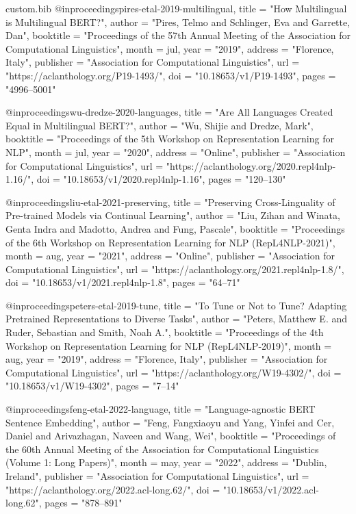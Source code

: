 \begin{filecontents*}[overwrite]{custom.bib}
@inproceedings{pires-etal-2019-multilingual,
    title = "How Multilingual is Multilingual {BERT}?",
    author = "Pires, Telmo  and
      Schlinger, Eva  and
      Garrette, Dan",
    booktitle = "Proceedings of the 57th Annual Meeting of the Association for Computational Linguistics",
    month = jul,
    year = "2019",
    address = "Florence, Italy",
    publisher = "Association for Computational Linguistics",
    url = "https://aclanthology.org/P19-1493/",
    doi = "10.18653/v1/P19-1493",
    pages = "4996--5001"
}

@inproceedings{wu-dredze-2020-languages,
    title = "Are All Languages Created Equal in Multilingual {BERT}?",
    author = "Wu, Shijie  and
      Dredze, Mark",
    booktitle = "Proceedings of the 5th Workshop on Representation Learning for NLP",
    month = jul,
    year = "2020",
    address = "Online",
    publisher = "Association for Computational Linguistics",
    url = "https://aclanthology.org/2020.repl4nlp-1.16/",
    doi = "10.18653/v1/2020.repl4nlp-1.16",
    pages = "120--130"
}

@inproceedings{liu-etal-2021-preserving,
    title = "Preserving Cross-Linguality of Pre-trained Models via Continual Learning",
    author = "Liu, Zihan  and
      Winata, Genta Indra  and
      Madotto, Andrea  and
      Fung, Pascale",
    booktitle = "Proceedings of the 6th Workshop on Representation Learning for NLP (RepL4NLP-2021)",
    month = aug,
    year = "2021",
    address = "Online",
    publisher = "Association for Computational Linguistics",
    url = "https://aclanthology.org/2021.repl4nlp-1.8/",
    doi = "10.18653/v1/2021.repl4nlp-1.8",
    pages = "64--71"
}

@inproceedings{peters-etal-2019-tune,
    title = "To Tune or Not to Tune? Adapting Pretrained Representations to Diverse Tasks",
    author = "Peters, Matthew E.  and
      Ruder, Sebastian  and
      Smith, Noah A.",
    booktitle = "Proceedings of the 4th Workshop on Representation Learning for NLP (RepL4NLP-2019)",
    month = aug,
    year = "2019",
    address = "Florence, Italy",
    publisher = "Association for Computational Linguistics",
    url = "https://aclanthology.org/W19-4302/",
    doi = "10.18653/v1/W19-4302",
    pages = "7--14"
}

@inproceedings{feng-etal-2022-language,
    title     = "Language-agnostic {BERT} Sentence Embedding",
    author    = "Feng, Fangxiaoyu  and
      Yang, Yinfei  and
      Cer, Daniel  and
      Arivazhagan, Naveen  and
      Wang, Wei",
    booktitle = "Proceedings of the 60th Annual Meeting of the Association for Computational Linguistics (Volume 1: Long Papers)",
    month     = may,
    year      = "2022",
    address   = "Dublin, Ireland",
    publisher = "Association for Computational Linguistics",
    url       = "https://aclanthology.org/2022.acl-long.62/",
    doi       = "10.18653/v1/2022.acl-long.62",
    pages     = "878--891"
}


\end{filecontents*}
